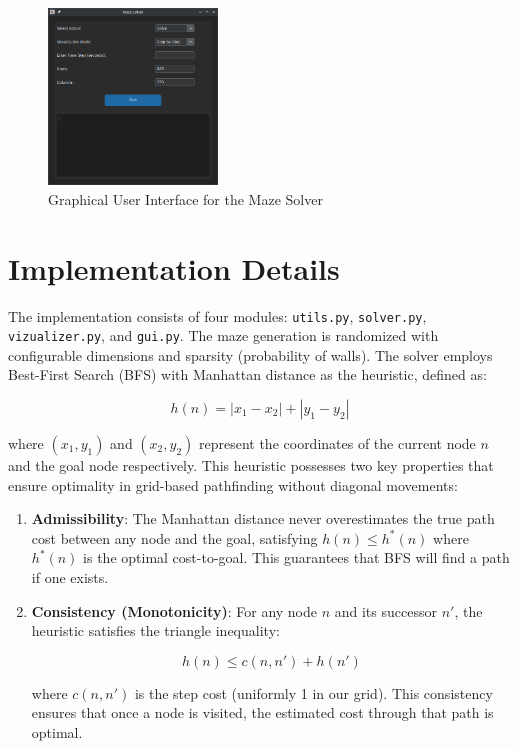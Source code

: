 \documentclass{report}
\begin{document}
\begin{figure}[h]
    \centering
    \includegraphics[width=0.4\textwidth]{assets/gui}
    \caption{Graphical User Interface for the Maze Solver}
    \label{fig:gui}
\end{figure}


\section{Implementation Details}
The implementation consists of four modules: \texttt{utils.py}, \texttt{solver.py}, \texttt{vizualizer.py}, and \texttt{gui.py}. The maze generation is randomized with configurable dimensions and sparsity (probability of walls). The solver employs Best-First Search (BFS) with Manhattan distance as the heuristic, defined as:

\[ h(n) = |x_1 - x_2| + |y_1 - y_2| \]

where $(x_1, y_1)$ and $(x_2, y_2)$ represent the coordinates of the current node $n$ and the goal node respectively. This heuristic possesses two key properties that ensure optimality in grid-based pathfinding without diagonal movements:

\begin{enumerate}
	\item \textbf{Admissibility}: The Manhattan distance never overestimates the true path cost between any node and the goal, satisfying $h(n) \leq h^*(n)$ where $h^*(n)$ is the optimal cost-to-goal. This guarantees that BFS will find a path if one exists.
	
	\item \textbf{Consistency (Monotonicity)}: For any node $n$ and its successor $n'$, the heuristic satisfies the triangle inequality:
	
	\[ h(n) \leq c(n,n') + h(n') \]
	
	where $c(n,n')$ is the step cost (uniformly 1 in our grid). This consistency ensures that once a node is visited, the estimated cost through that path is optimal.
\end{enumerate}
\end{document}
